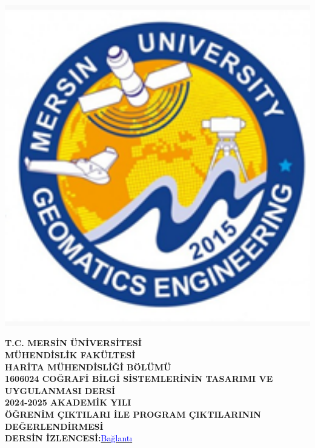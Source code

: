 \documentclass[12pt,a4paper]{article}
\begin{document}
\begin{titlepage}
    \centering
    \begin{minipage}[t]{0.15\textwidth}
        \includegraphics[width=1.5\textwidth]{bölüm_logo.png}
    \end{minipage}
    \hfill
    \begin{minipage}[t]{0.9\textwidth}
        \centering
        \vspace{1cm}
        {\Large \textbf{T.C. MERSİN ÜNİVERSİTESİ}}\\[0.2cm]
        {\Large \textbf{MÜHENDİSLİK FAKÜLTESİ}}\\[0.2cm]
        {\Large \textbf{HARİTA MÜHENDİSLİĞİ BÖLÜMÜ}}\\[1.2cm]
        {\Large \textbf{1606024 COĞRAFİ BİLGİ SİSTEMLERİNİN TASARIMI VE UYGULANMASI DERSİ}}\\[0.5cm]
        {\Large \textbf{2024-2025 AKADEMİK YILI}}\\[0.5cm]
        {\Large \textbf{ÖĞRENİM ÇIKTILARI İLE PROGRAM ÇIKTILARININ DEĞERLENDİRMESİ}}\\[1cm]
        {\large\textbf{DERSİN İZLENCESİ:}}\href{https://drive.google.com/file/d/1orsLVNL4cDUjDvZI44Fa12cOD4x6A5u2/view?usp=drive_link}{\textcolor{blue}{Bağlantı}}
    \end{minipage}
\end{titlepage}
\end{document}
